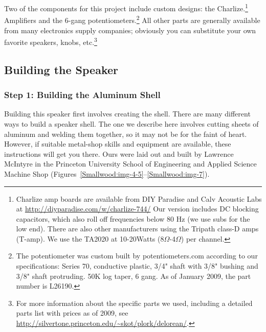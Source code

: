 Two of the components for this project include custom designs: the
Charlize.\footnote{Charlize amp boards are available from DIY Paradise and Calv
Acoustic Labs at \url{http://diyparadise.com/w/charlize-744/} Our version includes DC
blocking capacitors, which also roll off frequencies below 80 Hz (we use subs for
the low end). There are also other manufacturers using the Tripath class-D amps
(T-amp).  We use the TA2020 at 10-20Watts (8$\Omega{}$-4$\Omega{}$) per channel.}
Amplifiers and the 6-gang potentiometers.\footnote{The potentiometer was custom
built by potentiometers.com  according to our specifications: Series 70,
conductive plastic, 3/4" shaft with 3/8" bushing and 3/8" shaft protruding. 50K
log taper, 6 gang.  As of January 2009, the part number is L26190.}  All other
parts are generally available from many electronics supply companies; obviously
you can substitute your own favorite speakers, knobs, etc.\footnote{For more
information about the specific parts we used, including a detailed parts list
with prices as of 2009, see
\url{http://silvertone.princeton.edu/~skot/plork/delorean/}.}

\subsection{Building the Speaker}

\subsubsection{Step 1: Building the Aluminum Shell}

Building this speaker first involves creating the shell. There are many
different ways to build a speaker shell. The one we describe here involves
cutting sheets of aluminum and welding them together, so it may not be for the
faint of heart. However, if suitable metal-shop skills and equipment are
available, these instructions will get you there. Ours were laid out and built by
Lawrence McIntyre in the Princeton University School of Engineering and Applied
Science Machine Shop (Figures~\ref{Smallwood:img-4-5}--\ref{Smallwood:img-7}).

